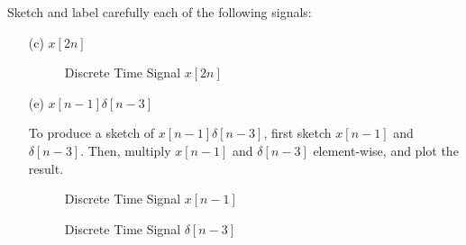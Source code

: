 \documentclass[fleqn]{article}
\begin{document}
\begin{enumerate}[nolistsep]
		Sketch and label carefully each of the following signals:
		
		\begin{enumerate}[nolistsep]
			\item[(c)] $x[2n]$
			
			
			\begin{figure}[H]				
			\centerline{}
		\caption{Discrete Time Signal $x[2n]$}
		\label{part_c}
		\end{figure} \break
		
			\item[(e)] $x[n - 1]\delta[n - 3]$
			
			To produce a sketch of $x[n - 1]\delta[n - 3]$, first sketch $x[n - 1]$ and $\delta[n - 3]$. Then, multiply $x[n - 1]$ and $\delta[n - 3]$ element-wise, and plot the result.
			
			\begin{figure}[H]
			\centerline{}
		\caption{Discrete Time Signal $x[n-1]$}
		\label{part_e_x_nm1}
		\end{figure}
			
			\begin{figure}[H]
			\centerline{}
		\caption{Discrete Time Signal $\delta[n-3]$}
		\label{part_e_delta_nm3}
		\end{figure}
		

\end{enumerate}
\end{enumerate}
\end{document}
